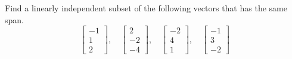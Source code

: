 \documentclass{ximera}
\begin{document}
\begin{exercise}
    Find a linearly independent subset of the following vectors that has the same span.
    \begin{equation*}
        \begin{bmatrix}
            -1 \\ 
            1 \\ 
            2
        \end{bmatrix}
        , \quad
        \begin{bmatrix}
            2 \\ 
            -2 \\ 
            -4
        \end{bmatrix}
        , \quad
        \begin{bmatrix}
            -2 \\ 
            4 \\ 
            1
        \end{bmatrix}
        , \quad
        \begin{bmatrix}
            -1 \\ 
            3 \\ 
            -2
        \end{bmatrix}
    \end{equation*}
\end{exercise}
\end{document}
